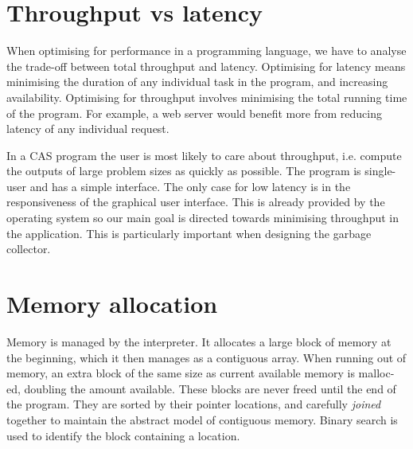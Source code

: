 \section{Throughput vs latency}
When optimising for performance in a programming language, we have to analyse the trade-off between
total throughput and latency. Optimising for latency means minimising the duration of any individual
task in the program, and increasing availability. Optimising for throughput involves minimising the
total running time of the program. For example, a web server would benefit more from reducing latency
of any individual request.

In a CAS program the user is most likely to care about throughput, i.e. compute the outputs of large
problem sizes as quickly as possible. The program is single-user and has a simple interface. The only case
for low latency is in the responsiveness of the graphical user interface. This is already provided by the
operating system so our main goal is directed towards minimising throughput in the application.
This is particularly important when designing the garbage collector.

\section{Memory allocation}
Memory is managed by the interpreter. It allocates a large block of memory at the beginning,
which it then manages as a contiguous array. When running out of memory, an extra block of the
same size as current available memory is malloc-ed, doubling the amount available. These blocks are
never freed until the end of the program. They are sorted by their pointer locations,
and carefully \emph{joined} together to maintain the abstract model of contiguous memory. Binary search
is used to identify the block containing a location.


